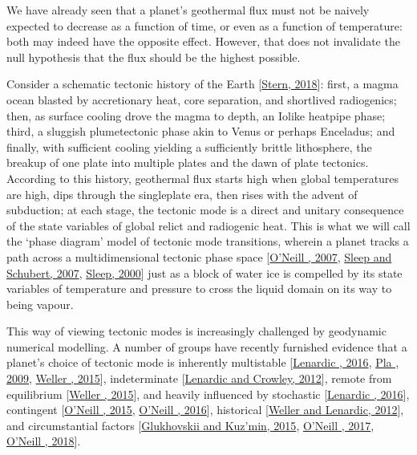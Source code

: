 \documentclass[letterpaper,10pt,english]{jupyterBook}
\begin{document}
\sphinxAtStartPar
We have already seen that a planet’s geothermal flux must not be naively expected to decrease as a function of time, or even as a function of temperature: both may indeed have the opposite effect. However, that does not invalidate the null hypothesis that the flux should be the highest possible.

\sphinxAtStartPar
Consider a schematic tectonic history of the Earth {[}\hyperlink{cite.references:id418}{Stern, 2018}{]}: first, a magma ocean blasted by accretionary heat, core separation, and short\sphinxhyphen{}lived radiogenics; then, as surface cooling drove the magma to depth, an Io\sphinxhyphen{}like heat\sphinxhyphen{}pipe phase; third, a sluggish plume\sphinxhyphen{}tectonic phase akin to Venus or perhaps Enceladus; and finally, with sufficient cooling yielding a sufficiently brittle lithosphere, the breakup of one plate into multiple plates and the dawn of plate tectonics. According to this history, geothermal flux starts high when global temperatures are high, dips through the single\sphinxhyphen{}plate era, then rises with the advent of subduction; at each stage, the tectonic mode is a direct and unitary consequence of the state variables of global relict and radiogenic heat. This is what we will call the ‘phase diagram’ model of tectonic mode transitions, wherein a planet tracks a path across a multidimensional tectonic phase space {[}\hyperlink{cite.references:id91}{O'Neill , 2007}, \hyperlink{cite.references:id651}{Sleep and Schubert, 2007}, \hyperlink{cite.references:id255}{Sleep, 2000}{]} just as a block of water ice is compelled by its state variables of temperature and pressure to cross the liquid domain on its way to being vapour.

\sphinxAtStartPar
This way of viewing tectonic modes is increasingly challenged by geodynamic numerical modelling. A number of groups have recently furnished evidence that a planet’s choice of tectonic mode is inherently multistable {[}\hyperlink{cite.references:id657}{Lenardic , 2016}, \hyperlink{cite.references:id658}{Pla , 2009}, \hyperlink{cite.references:id195}{Weller , 2015}{]}, indeterminate {[}\hyperlink{cite.references:id332}{Lenardic and Crowley, 2012}{]}, remote from equilibrium {[}\hyperlink{cite.references:id195}{Weller , 2015}{]}, and heavily influenced by stochastic {[}\hyperlink{cite.references:id398}{Lenardic , 2016}{]}, contingent {[}\hyperlink{cite.references:id653}{O'Neill , 2015}, \hyperlink{cite.references:id224}{O'Neill , 2016}{]}, historical {[}\hyperlink{cite.references:id656}{Weller and Lenardic, 2012}{]}, and circumstantial factors {[}\hyperlink{cite.references:id654}{Glukhovskii and Kuz'min, 2015}, \hyperlink{cite.references:id652}{O'Neill , 2017}, \hyperlink{cite.references:id421}{O'Neill , 2018}{]}.
\end{document}
